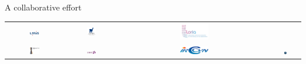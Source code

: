 \documentclass[noamsthm, pdftex, french]{beamer}
\begin{document}
\begin{frame}
\begin{columns}
    \begin{block}{A collaborative effort}
      \begin{center}
        
      
        \begin{tabular}{cccc}
          \includegraphics[width=0.2\textwidth]{liris-logo}\hspace*{2cm}&
          \includegraphics[width=0.2\textwidth]{lama-logo}\hspace*{2cm}&
          \includegraphics[width=0.2\textwidth]{loria-logo}\hspace*{2cm}&\hspace*{2cm} \\
          \includegraphics[width=0.2\textwidth]{gipsa-logo}\hspace*{2cm}&
          \includegraphics[width=0.2\textwidth]{greyc-logo}\hspace*{2cm}&
          \includegraphics[width=0.2\textwidth]{irccyn-logo}\hspace*{2cm}&
          \includegraphics[width=0.10\textwidth]{logoCNRS}
        \end{tabular}
      

\end{center}
\end{block}
\end{columns}
\end{frame}
\end{document}
